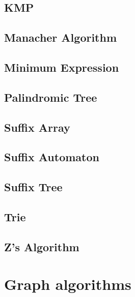 \subsection{KMP}
\raggedbottom
\hrulefill
\subsection{Manacher Algorithm}
\raggedbottom
\hrulefill
\subsection{Minimum Expression}
\raggedbottom
\hrulefill
\subsection{Palindromic Tree}
\raggedbottom
\hrulefill
\subsection{Suffix Array}
\raggedbottom
\hrulefill
\subsection{Suffix Automaton}
\raggedbottom
\hrulefill
\subsection{Suffix Tree}
\raggedbottom
\hrulefill
\subsection{Trie}
\raggedbottom
\hrulefill
\subsection{Z's Algorithm}
\raggedbottom
\hrulefill

\section{Graph algorithms}
